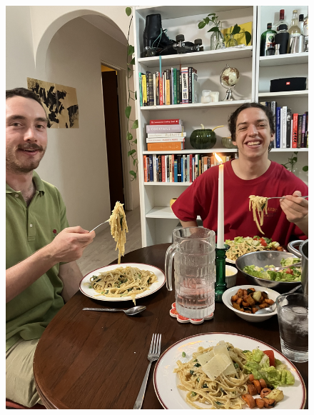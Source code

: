 \documentclass[]{article}
\begin{document}
\newpage\begin{figure}[H]
\begin{center}\hyperref[rec:Fettuccine Alfredo]{\includegraphics[keepaspectratio,width=\textheight,height=\textwidth,angle=-90]{Gallery/Fettuccine Alfredo}}\caption*{}\label{fig:Fettuccine Alfredo}\end{center}
\end{figure}
\end{document}
